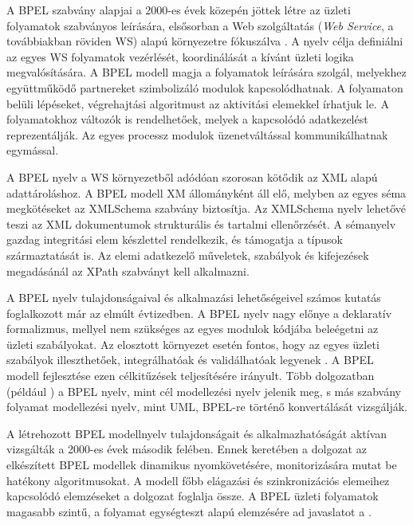 

A BPEL szabvány alapjai a 2000-es évek közepén jöttek létre az üzleti folyamatok szabványos leírására, elsősorban a Web szolgáltatás (\textit{Web Service}, a továbbiakban röviden WS) alapú környezetre fókuszálva \cite{andrews2003business}. A nyelv célja definiálni az  egyes WS folyamatok vezérlését, koordinálását a kívánt üzleti logika megvalósítására.  A BPEL modell magja  a folyamatok leírására szolgál, melyekhez együttműködő partnereket szimbolizáló modulok kapcsolódhatnak. A folyamaton belüli lépéseket, végrehajtási algoritmust az aktivitási elemekkel írhatjuk le. A folyamatokhoz változók is rendelhetőek, melyek a kapcsolódó adatkezelést reprezentálják. Az egyes processz modulok üzenetváltással kommunikálhatnak egymással.   

A BPEL nyelv a WS környezetből adódóan szorosan kötődik az XML alapú adattároláshoz. A BPEL modell XM állományként áll elő, melyben az egyes séma megkötéseket az XMLSchema szabvány biztosítja. Az XMLSchema nyelv lehetővé teszi az XML dokumentumok strukturális és tartalmi ellenőrzését. A sémanyelv  gazdag integritási elem készlettel rendelkezik, és támogatja a típusok származtatását is. Az elemi adatkezelő műveletek, szabályok és kifejezések megadásánál az XPath szabványt kell alkalmazni.  

A BPEL nyelv tulajdonságaival és alkalmazási lehetőségeivel számos kutatás foglalkozott már az elmúlt évtizedben. A BPEL nyelv nagy előnye a deklaratív formalizmus, mellyel nem szükséges  az egyes modulok kódjába beleégetni az üzleti szabályokat. Az elosztott környezet esetén fontos, hogy az egyes üzleti szabályok illeszthetőek, integrálhatóak és validálhatóak legyenek \cite{rosenberg2005business}. A BPEL modell fejlesztése ezen célkitűzések teljesítésére irányult. Több dolgozatban (például \cite{ouyang2006translating}) a BPEL nyelv, mint cél modellezési nyelv jelenik meg, s más szabvány folyamat modellezési nyelv, mint UML, BPEL-re történő konvertálását vizsgálják.   

A létrehozott BPEL modellnyelv tulajdonságait és alkalmazhatóságát  aktívan vizsgálták a 2000-es évek második felében. Ennek keretében a \cite{baresi2005towards} dolgozat az elkészített BPEL modellek dinamikus nyomkövetésére, monitorizására mutat be hatékony algoritmusokat. A modell főbb elágazási és szinkronizációs elemeihez kapcsolódó elemzéseket a \cite{ouyang2005wofbpel} dolgozat foglalja össze. A BPEL üzleti folyamatok magasabb szintű, a folyamat egységteszt alapú elemzésére ad javaslatot a \cite{mayer2006towards}.

